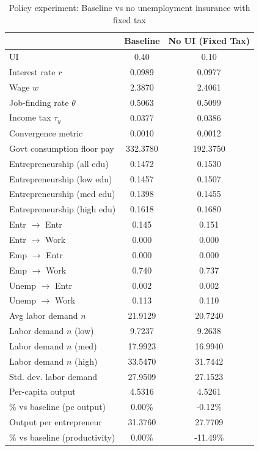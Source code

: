 \begin{table}[H]
\caption{Policy experiment: Baseline vs no unemployment insurance with fixed tax}
\label{tab:exp_noui_fixedtax}
\centering
\small
\begin{tabular}{|l|c|c|}
\hline
 & Baseline & No UI (Fixed Tax) \\
\hline
UI & 0.40 & 0.10 \\
\hline
Interest rate $r$ & 0.0989 & 0.0977 \\
\hline
Wage $w$ & 2.3870 & 2.4061 \\
\hline
Job-finding rate $\theta$ & 0.5063 & 0.5099 \\
\hline
Income tax $\tau_y$ & 0.0377 & 0.0386 \\
\hline
Convergence metric & 0.0010 & 0.0012 \\
\hline
Govt consumption floor pay & 332.3780 & 192.3750 \\
\hline
Entrepreneurship (all edu) & 0.1472 & 0.1530 \\
\hline
Entrepreneurship (low edu) & 0.1457 & 0.1507 \\
\hline
Entrepreneurship (med edu) & 0.1398 & 0.1455 \\
\hline
Entrepreneurship (high edu) & 0.1618 & 0.1680 \\
\hline
Entr $\rightarrow$ Entr & 0.145 & 0.151 \\
\hline
Entr $\rightarrow$ Work & 0.000 & 0.000 \\
\hline
Emp $\rightarrow$ Entr & 0.000 & 0.000 \\
\hline
Emp $\rightarrow$ Work & 0.740 & 0.737 \\
\hline
Unemp $\rightarrow$ Entr & 0.002 & 0.002 \\
\hline
Unemp $\rightarrow$ Work & 0.113 & 0.110 \\
\hline
Avg labor demand $n$ & 21.9129 & 20.7240 \\
\hline
Labor demand $n$ (low) & 9.7237 & 9.2638 \\
\hline
Labor demand $n$ (med) & 17.9923 & 16.9940 \\
\hline
Labor demand $n$ (high) & 33.5470 & 31.7442 \\
\hline
Std. dev. labor demand & 27.9509 & 27.1523 \\
\hline
Per-capita output & 4.5316 & 4.5261 \\
\hline
\% vs baseline (pc output) & 0.00\% & -0.12\% \\
\hline
Output per entrepreneur & 31.3760 & 27.7709 \\
\hline
\% vs baseline (productivity) & 0.00\% & -11.49\% \\
\hline
\end{tabular}
\end{table}
